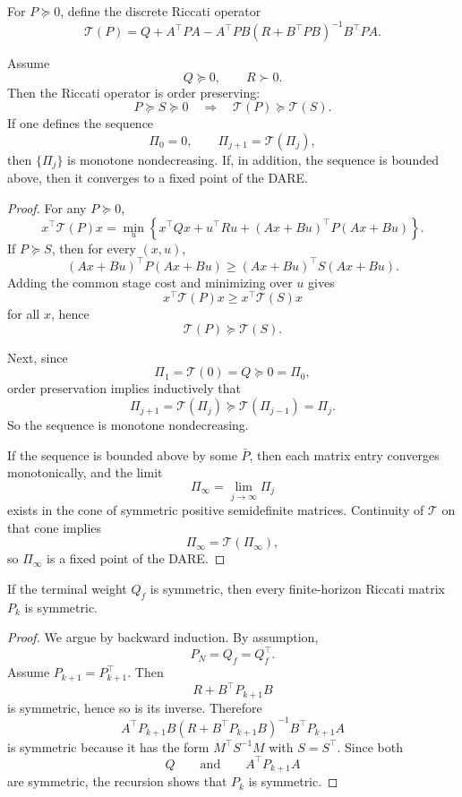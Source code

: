 \begin{definition}\label{def:l6-riccati-operator}
	For $P \succeq 0$, define the discrete Riccati operator
	\[
		\mathcal{T}(P)
		=
		Q + A^\top P A - A^\top P B\left(R+B^\top P B\right)^{-1}B^\top P A.
	\]
\end{definition}

\begin{theorem}\label{thm:l6-monotonicity-and-convergence-of-the-riccati-iteration}
	Assume
	\[
		Q \succeq 0,
		\qquad
		R \succ 0.
	\]
	Then the Riccati operator is order preserving:
	\[
		P \succeq S \succeq 0
		\quad \Longrightarrow \quad
		\mathcal{T}(P) \succeq \mathcal{T}(S).
	\]
	If one defines the sequence
	\[
		\Pi_0=0,
		\qquad
		\Pi_{j+1}=\mathcal{T}(\Pi_j),
	\]
	then $\{\Pi_j\}$ is monotone nondecreasing. If, in addition, the sequence is bounded above, then it converges to a fixed point of the DARE.
\end{theorem}
\begin{proof}
	For any $P \succeq 0$,
	\[
		x^\top \mathcal{T}(P)x
		=
		\min_u
		\left\{
		x^\top Qx + u^\top Ru + (Ax+Bu)^\top P(Ax+Bu)
		\right\}.
	\]
	If $P \succeq S$, then for every $(x,u)$,
	\[
		(Ax+Bu)^\top P(Ax+Bu)
		\ge
		(Ax+Bu)^\top S(Ax+Bu).
	\]
	Adding the common stage cost and minimizing over $u$ gives
	\[
		x^\top \mathcal{T}(P)x \ge x^\top \mathcal{T}(S)x
	\]
	for all $x$, hence
	\[
		\mathcal{T}(P) \succeq \mathcal{T}(S).
	\]

	Next, since
	\[
		\Pi_1=\mathcal{T}(0)=Q \succeq 0=\Pi_0,
	\]
	order preservation implies inductively that
	\[
		\Pi_{j+1}=\mathcal{T}(\Pi_j)\succeq \mathcal{T}(\Pi_{j-1})=\Pi_j.
	\]
	So the sequence is monotone nondecreasing.

	If the sequence is bounded above by some $\bar P$, then each matrix entry converges monotonically, and the limit
	\[
		\Pi_\infty = \lim_{j \to \infty}\Pi_j
	\]
	exists in the cone of symmetric positive semidefinite matrices. Continuity of $\mathcal{T}$ on that cone implies
	\[
		\Pi_\infty = \mathcal{T}(\Pi_\infty),
	\]
	so $\Pi_\infty$ is a fixed point of the DARE.
\end{proof}

\begin{proposition}\label{prop:l6-symmetry-of-the-riccati-matrices}
	If the terminal weight $Q_f$ is symmetric, then every finite-horizon Riccati matrix $P_k$ is symmetric.
\end{proposition}
\begin{proof}
	We argue by backward induction. By assumption,
	\[
		P_N=Q_f=Q_f^\top.
	\]
	Assume $P_{k+1}=P_{k+1}^\top$. Then
	\[
		R+B^\top P_{k+1}B
	\]
	is symmetric, hence so is its inverse. Therefore
	\[
		A^\top P_{k+1}B\left(R+B^\top P_{k+1}B\right)^{-1}B^\top P_{k+1}A
	\]
	is symmetric because it has the form $M^\top S^{-1}M$ with $S=S^\top$. Since both
	\[
		Q
		\qquad \text{and} \qquad
		A^\top P_{k+1}A
	\]
	are symmetric, the recursion shows that $P_k$ is symmetric.
\end{proof}

